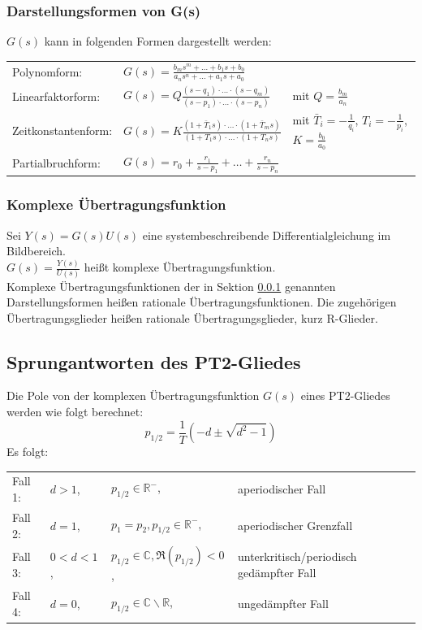 \documentclass[10pt,a4paper]{article}
\begin{document}
\subsubsection{Darstellungsformen von G(s)}
\label{darstell_gs}
$G(s)$ kann in folgenden Formen dargestellt werden: \\
\begin{tabular}{lll}
	Polynomform: & $G(s) = \frac{b_ms^m + \dots + b_1s + b_0}{a_ns^n + \dots + a_1s + a_0}$ \\
	Linearfaktorform: & $G(s) = Q \frac{(s - q_1) ⋅ \dots ⋅ (s - q_m)}{(s - p_1)⋅ \dots ⋅ (s - p_n)}$ & mit $Q = \frac{b_m}{a_n}$ \\
	Zeitkonstantenform: & $G(s) = K \frac{(1 + \bar{T}_1 s) ⋅ \dots ⋅ (1 + \bar{T}_m s)}{(1 + T_1s) ⋅ \dots ⋅ (1 + T_n s)}$ & mit $\bar{T}_i = - \frac 1 {q_i}$, $T_i = -\frac 1 {p_i}$, $K = \frac{b_0}{a_0}$ \\
	Partialbruchform: & $G(s) = r_0 + \frac{r_1}{s - p_1} + \dots + \frac{r_n}{s - p_n}$
\end{tabular}

\subsubsection{Komplexe Übertragungsfunktion}
Sei $Y(s) = G(s)U(s)$ eine systembeschreibende Differentialgleichung im Bildbereich. \\
$G(s) = \frac{Y(s)}{U(s)}$ heißt komplexe Übertragungsfunktion. \\
Komplexe Übertragungsfunktionen der in Sektion \ref{darstell_gs} genannten Darstellungsformen heißen rationale Übertragungsfunktionen. Die zugehörigen Übertragungsglieder heißen rationale Übertragungsglieder, kurz R-Glieder.

\subsection{Sprungantworten des PT2-Gliedes}
Die Pole von der komplexen Übertragungsfunktion $G(s)$ eines PT2-Gliedes werden wie folgt berechnet:
$$
	p_{1/2} = \frac 1 T (-d \pm \sqrt{d^2 - 1})
$$
Es folgt: \\
\begin{tabular}{llll}
	Fall 1: & $d > 1$, & $p_{1/2} \in \mathbb{R}^-$, & aperiodischer Fall \\
	Fall 2: & $d = 1$, & $p_1 = p_2, p_{1/2} \in \mathbb{R}^-$, & aperiodischer Grenzfall \\
	Fall 3: & $0 < d < 1$, & $p_{1/2} \in \mathbb{C}, \Re(p_{1/2}) < 0$, & unterkritisch/periodisch gedämpfter Fall \\
	Fall 4: & $d = 0$, & $p_{1/2} \in \mathbb{C} \backslash \mathbb{R}$, & ungedämpfter Fall
\end{tabular}
\end{document}
